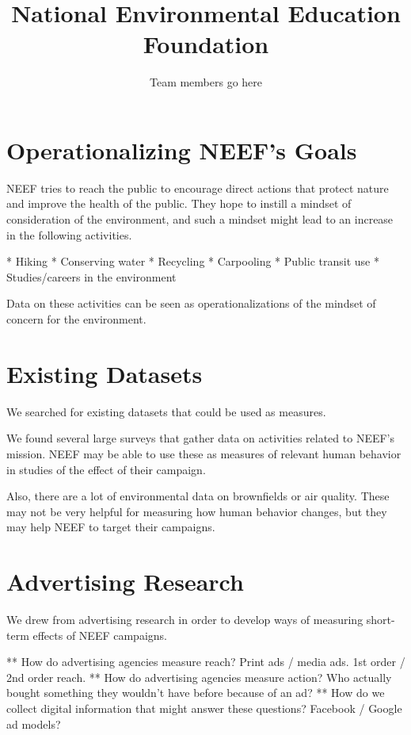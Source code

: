 \documentclass{article}
\title{National Environmental Education Foundation}
\author{Team members go here}
\begin{document}
\maketitle
{}

\section{Operationalizing NEEF's Goals}
NEEF tries to reach the public to encourage direct actions that protect nature and improve the health of the public.
They hope to instill a mindset of consideration of the environment, and such a mindset might lead to an increase
in the following activities.

* Hiking
* Conserving water
* Recycling
* Carpooling
* Public transit use
* Studies/careers in the environment

Data on these activities can be seen as operationalizations of the mindset of concern for the environment.

\section{Existing Datasets}
We searched for existing datasets that could be used as measures.

We found several large surveys that
gather data on activities related to NEEF's mission.
NEEF may be able to use these as measures of
relevant human behavior in studies of the effect of their campaign.

Also, there are a lot of environmental data on brownfields or air quality.
These may not be very helpful for measuring how human behavior changes,
but they may help NEEF to target their campaigns.

\section{Advertising Research}
We drew from advertising research in order to develop ways of measuring
short-term effects of NEEF campaigns.

** How do advertising agencies measure reach?  Print ads / media ads.  1st order / 2nd order reach.
** How do advertising agencies measure action?  Who actually bought something they wouldn't have before because of an ad?
** How do we collect digital information that might answer these questions?  Facebook / Google ad models?
\end{document}
